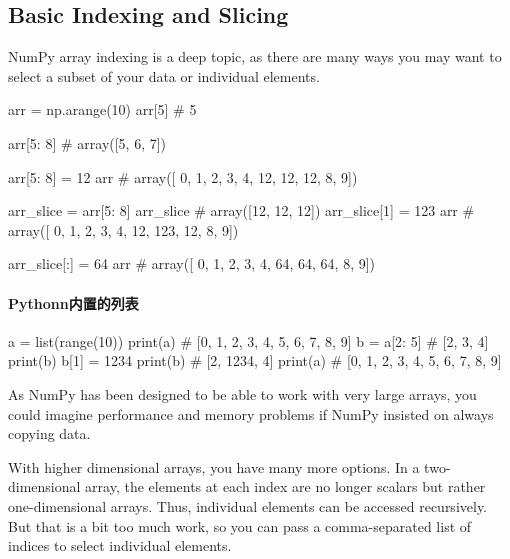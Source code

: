 \subsection{Basic Indexing and Slicing}
NumPy array indexing is a deep topic, as there are many ways you may want to select a subset of your data or individual elements.

\begin{pyc}
arr = np.arange(10)
arr[5]
# 5

arr[5: 8]
# array([5, 6, 7])

arr[5: 8] = 12
arr
# array([ 0,  1,  2,  3,  4, 12, 12, 12,  8,  9])
\end{pyc}

\begin{pyc}
arr_slice = arr[5: 8]
arr_slice
# array([12, 12, 12])
arr_slice[1] = 123
arr
# array([  0,   1,   2,   3,   4,  12, 123,  12,   8,   9])

arr_slice[:] = 64
arr
# array([ 0,  1,  2,  3,  4, 64, 64, 64,  8,  9])
\end{pyc}
\paragraph{Pythonn内置的列表}
\begin{pyc}
a = list(range(10))
print(a)
# [0, 1, 2, 3, 4, 5, 6, 7, 8, 9]
b = a[2: 5]
# [2, 3, 4]
print(b)
b[1] = 1234
print(b)
# [2, 1234, 4]
print(a)
# [0, 1, 2, 3, 4, 5, 6, 7, 8, 9]
\end{pyc}

As NumPy has been designed to be able to work with very large arrays, you could imagine performance and memory problems if NumPy insisted on always copying data.


With higher dimensional arrays, you have many more options. In a two-dimensional
array, the elements at each index are no longer scalars but rather one-dimensional
arrays. Thus, individual elements can be accessed recursively. But that is a bit too much
work, so you can pass a comma-separated list of indices to select individual elements.

